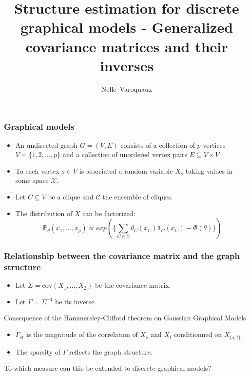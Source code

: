 \documentclass{beamer}
\title[3D Model of the genome]
{%
Structure estimation for discrete graphical models - Generalized covariance
matrices and their inverses
}
\author[Varoquaux]
{
  Nelle~Varoquaux\inst{1}
}
\institute[Mines ParisTech]
{
  \inst{1}%
  Mines ParisTech
}
\begin{document}
\begin{frame}
  \maketitle
\end{frame}

\begin{frame}
\frametitle{Graphical models}
\begin{itemize}
\item An undirected graph $G = (V, E)$ consists of a collection of $p$
vertices $ V = \{1, 2, \dots, p \}$ and a collection of unordered vertex pairs
$E \subseteq V \times V$
\item To each vertex $s \in V$ is associated a random variable $X_s$ taking
values in some space $\mathcal{X}$.
\item Let $C \subseteq V$ be a clique and $\mathcal{C}$ the ensemble of
cliques.
\item The distribution of $X$ can be factorized:
\begin{equation}
\mathbb{P}_\theta(x_1, \dots, x_p) \propto exp(\{ \sum_{C \in \mathcal{C}}
\theta_C (x_C) \mathbb{1}_C(x_C) - \Phi(\theta) \})
\end{equation}
\end{itemize}
\end{frame}

\begin{frame}
\frametitle{Relationship between the covariance matrix and the graph
structure}
\begin{itemize}
\item Let $\Sigma = \text{cov} (X_1, \dots, X_2)$ be the covariance matrix.
\item Let $\Gamma = \Sigma ^{-1}$ be its inverse.
\end{itemize}

\vspace{10px}
{\small
\begin{block}{Consequence of the Hammersley-Clifford theorem on Gaussian
Graphical Models}
\begin{itemize}
\item $\Gamma_{st}$ is the magnitude of the correlation of $X_s$ and $X_t$
conditionned on $X_{\{s,t\}}$.
\item The sparsity of $\Gamma$ reflects the graph structure.
\end{itemize}
\end{block}
\vspace{10px}
}
\textcolor{black!35!red}{To which measure can this be extended to discrete graphical
models?}

\end{frame}
\end{document}
